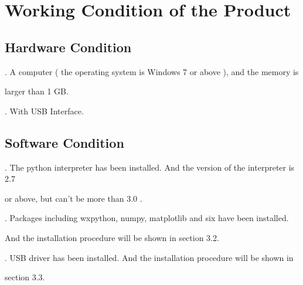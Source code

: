 \chapter{\heiti Working Condition of the Product}
\section{\heiti Hardware Condition}

. A computer ( the operating system is Windows 7 or above ), and the memory is

\hspace{-0.15cm}larger than 1 GB.

. With USB Interface.

\section{\heiti Software Condition}

.  The python interpreter has been installed. And the version of the interpreter is  2.7

\hspace{-0.15cm}or above, but can't be more than 3.0 .



. Packages including wxpython, numpy, matplotlib and six have been installed.

\hspace{-0.15cm}And the installation procedure will be shown in section 3.2.


. USB driver has been installed. And the installation procedure will be shown in

\hspace{-0.15cm}section 3.3.
